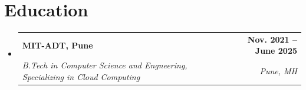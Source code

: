 \documentclass[letterpaper,11pt]{article}
\makeatletter
\newcommand{\resumeSubheading}[4]{
  \vspace{-2pt}\item
    \begin{tabular*}{1.0\textwidth}[t]{l@{\extracolsep{\fill}}r}
      \textbf{#1} & \textbf{\small #2} \\
      \textit{\small#3} & \textit{\small #4} \\
    \end{tabular*}\vspace{-7pt}
}
\newcommand{\resumeSubHeadingListStart}{\begin{itemize}[leftmargin=0.0in, label={}]}
\newcommand{\resumeSubHeadingListEnd}{\end{itemize}}
\makeatother
\begin{document}
\vspace{-0.5em}



\section{Education}
  \resumeSubHeadingListStart
    \resumeSubheading
      {MIT-ADT, Pune}{Nov. 2021 -- June 2025}
      {B.Tech in Computer Science and Engneering, Specializing in Cloud Computing}{Pune, MH}
  \resumeSubHeadingListEnd

\end{document}

